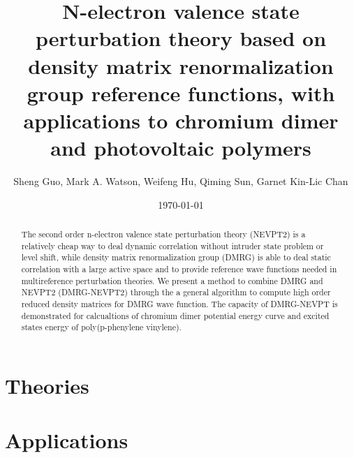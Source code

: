 \documentclass[
 aip,
 jcp,
 numerical ,
 reprint, %
]{revtex4-1}
\begin{document}
\title{N-electron valence state perturbation theory based on density matrix renormalization group reference functions, with applications to chromium dimer and photovoltaic polymers}
\author{Sheng Guo, Mark A. Watson, Weifeng Hu, Qiming Sun, Garnet Kin-Lic Chan}

\begin{abstract}

The second order n-electron valence state perturbation theory (NEVPT2) is a relatively cheap way to deal dynamic correlation without intruder state problem or level shift, while density matrix renormalization group (DMRG) is able to deal static correlation with a large active space and to provide reference wave functions needed in multireference perturbation theories.
We present a method to combine DMRG and NEVPT2 (DMRG-NEVPT2) through the a general algorithm to compute high order reduced density matrices for DMRG wave function. The capacity of DMRG-NEVPT is demonstrated for calcualtions of chromium dimer potential energy curve and excited states energy of poly(p-phenylene vinylene).

\end{abstract}

\date{\today}

\maketitle



\section{Theories}







\section{Applications}










{}
\end{document}
